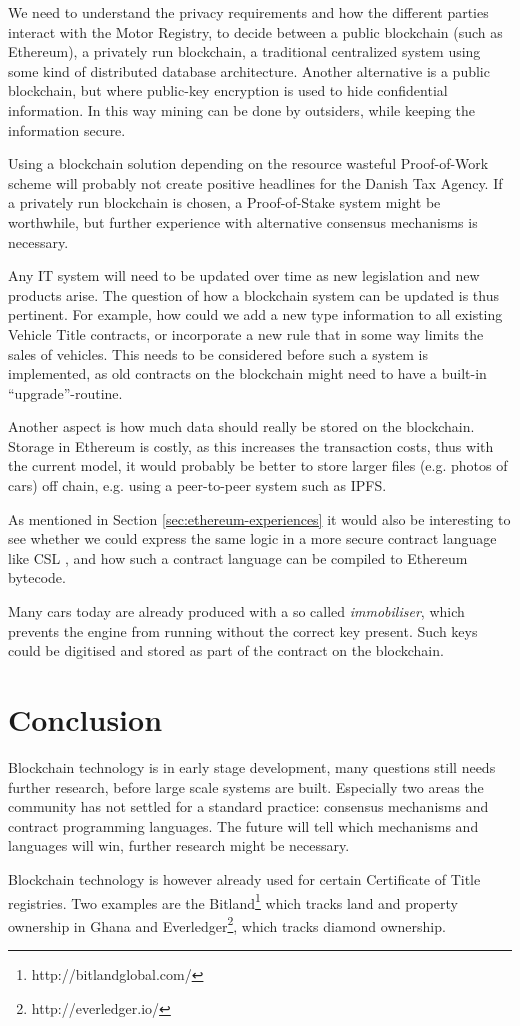 \documentclass[oneside,a4paper,10pts,article]{memoir}
\begin{document}
We need to understand the privacy requirements and how the different
parties interact with the Motor Registry, to decide between a public
blockchain (such as Ethereum), a privately run blockchain, a
traditional centralized system using some kind of distributed database
architecture. Another alternative is a public blockchain, but where
public-key encryption is used to hide confidential information. In
this way mining can be done by outsiders, while keeping the
information secure.

Using a blockchain solution depending on the resource wasteful
Proof-of-Work scheme will probably not create positive headlines for
the Danish Tax Agency. If a privately run blockchain is chosen, a
Proof-of-Stake system might be worthwhile, but further experience with
alternative consensus mechanisms is necessary.

Any IT system will need to be updated over time as new legislation and
new products arise. The question of how a blockchain system can be
updated is thus pertinent. For example, how could we add a new type
information to all existing Vehicle Title contracts, or incorporate a
new rule that in some way limits the sales of vehicles. This needs to
be considered before such a system is implemented, as old contracts on
the blockchain might need to have a built-in ``upgrade''-routine.

Another aspect is how much data should really be stored on the
blockchain. Storage in Ethereum is costly, as this increases the
transaction costs, thus with the current model, it would probably be
better to store larger files (e.g. photos of cars) off chain,
e.g. using a peer-to-peer system such as IPFS.

As mentioned in Section \ref{sec:ethereum-experiences} it would also
be interesting to see whether we could express the same logic in a
more secure contract language like CSL \cite{hvitved2011contract}, and
how such a contract language can be compiled to Ethereum bytecode.

Many cars today are already produced with a so called
\textit{immobiliser}, which prevents the engine from running without
the correct key present. Such keys could be digitised and stored as
part of the contract on the blockchain.

\chapter{Conclusion}
\label{sec:conclusion}
Blockchain technology is in early stage development, many questions
still needs further research, before large scale systems are
built. Especially two areas the community has not settled for a
standard practice: consensus mechanisms and contract programming
languages. The future will tell which mechanisms and languages will
win, further research might be necessary.

Blockchain technology is however already used for certain Certificate
of Title registries. Two examples are the
Bitland\footnote{http://bitlandglobal.com/} which tracks land and
property ownership in Ghana and
Everledger\footnote{http://everledger.io/}, which tracks diamond
ownership.



\end{document}
